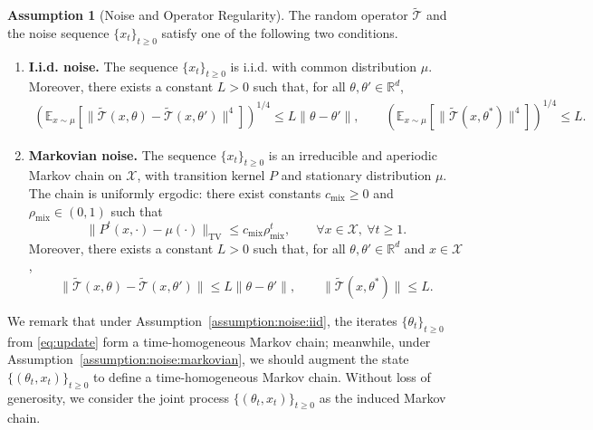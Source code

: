 \documentclass[11pt,letterpaper]{article}
\theoremstyle{plain}
\theoremstyle{definition}
\newtheorem{assumption}{Assumption}
\theoremstyle{remark}
\newcommand{\mT}{\mathcal{T}}
\newcommand{\tmT}{\widetilde{\mT}}
\begin{document}
\begin{assumption}[Noise and Operator Regularity]
\label{assumption:noise}
The random operator \(\tmT\) and the noise sequence \(\{x_t\}_{t\ge 0}\)
satisfy one of the following two conditions.

\begin{enumerate}[label=(\roman*), ref=\theassumption(\roman*)]

\item \textbf{I.i.d. noise.}\label{assumption:noise:iid}
The sequence \(\{x_t\}_{t\ge 0}\) is i.i.d. with common distribution \(\mu\).
Moreover, there exists a constant \(L>0\) such that, for all
\(\theta,\theta'\in\mathbb R^d\),
\begin{align*}
\left(
\mathbb E_{x\sim\mu}
\left[
\big\|\tmT(x,\theta)-\tmT(x,\theta')\big\|^4
\right]
\right)^{1/4}
\le L\|\theta-\theta'\|, \qquad \left(
\mathbb E_{x\sim\mu}
\left[
\big\|\tmT(x,\theta^*)\big\|^4
\right]
\right)^{1/4}
\le L .
\end{align*}

\item \textbf{Markovian noise.}\label{assumption:noise:markovian}
The sequence \(\{x_t\}_{t\ge 0}\) is an irreducible and aperiodic Markov chain
on \(\mathcal X\), with transition kernel \(P\) and stationary distribution
\(\mu\). The chain is uniformly ergodic: there exist constants
\(c_{\mathrm{mix}}\ge 0\) and \(\rho_{\mathrm{mix}}\in(0,1)\) such that
\begin{equation}\label{eq:uniform-GE}
\big\|P^t(x,\cdot)-\mu(\cdot)\big\|_{\mathrm{TV}}
\le c_{\mathrm{mix}}\rho_{\mathrm{mix}}^t,
\qquad
\forall x\in\mathcal X,\ \forall t\ge 1 .
\end{equation}
Moreover, there exists a constant \(L>0\) such that, for all
\(\theta,\theta'\in\mathbb R^d\) and \(x\in\mathcal X\),
\begin{equation*}
\big\|\tmT(x,\theta)-\tmT(x,\theta')\big\|
\le L\|\theta-\theta'\|,
\qquad
\big\|\tmT(x,\theta^*)\big\|
\le L .
\end{equation*}

\end{enumerate}
\end{assumption}

We remark that under Assumption~\ref{assumption:noise:iid}, the iterates $\{\theta_t\}_{t \geq 0}$ from \eqref{eq:update} form a time-homogeneous Markov chain; meanwhile, under Assumption~\ref{assumption:noise:markovian}, we should augment the state $\{(\theta_t,x_t)\}_{t \geq 0}$ to define a time-homogeneous Markov chain. Without loss of generosity, we consider the joint process $\{(\theta_t,x_t)\}_{t \geq 0}$ as the induced Markov chain.
\end{document}
